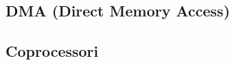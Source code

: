 \subsection[DMA (Direct Memory Access)]{DMA (Direct Memory Access)}
\subsection[Coprocessori]{Coprocessori}





%	
%	


